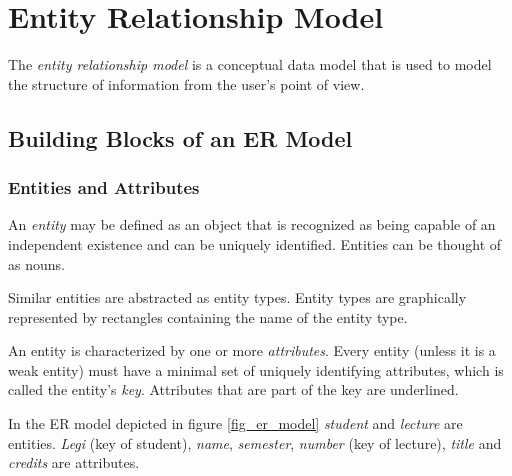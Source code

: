 

\section{Entity Relationship Model}

The \emph{entity relationship model} is a conceptual data model that is used to model the structure of information from the user's point of view.




\subsection{Building Blocks of an ER Model}




\subsubsection{Entities and Attributes}

An \emph{entity} may be defined as an object that is recognized as being capable of an independent existence and can be uniquely identified. Entities can be thought of as nouns.

Similar entities are abstracted as entity types. Entity types are graphically represented by rectangles containing the name of the entity type.

An entity is characterized by one or more \emph{attributes}. Every entity (unless it is a weak entity) must have a minimal set of uniquely identifying attributes, which is called the entity's \emph{key}. Attributes that are part of the key are underlined.

\begin{example}
In the ER model depicted in figure \ref{fig_er_model} \textit{student} and \textit{lecture} are entities. \textit{Legi} (key of student), \textit{name}, \textit{semester}, \textit{number} (key of lecture), \textit{title} and \textit{credits} are attributes.
\end{example}

